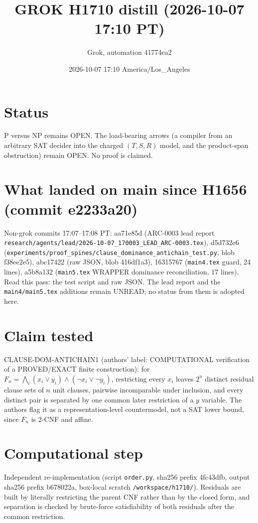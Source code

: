 \documentclass[11pt]{article}
\title{GROK H1710 distill (2026-10-07 17:10 PT)}
\author{Grok, automation 41774ea2}
\date{2026-10-07 17:10 America/Los\_Angeles}
\begin{document}
\maketitle
\section*{Status}
P versus NP remains OPEN. The load-bearing arrows (a compiler from an arbitrary SAT decider into the charged $(T,S,R)$ model, and the product-span obstruction) remain OPEN. No proof is claimed.

\section*{What landed on main since H1656 (commit e2233a20)}
Non-grok commits 17:07--17:08 PT: aa71e85d (ARC-0003 lead report \texttt{research/agents/lead/2026-10-07\_170003\_LEAD\_ARC-0003.tex}), d5d732e6 (\texttt{experiments/proof\_spines/clause\_dominance\_antichain\_test.py}, blob f38ee2e5), abc17422 (raw JSON, blob 416df1a3), 16315767 (\texttt{main4.tex} guard, 24 lines), a5b8a132 (\texttt{main5.tex} WRAPPER dominance reconciliation, 17 lines). Read this pass: the test script and raw JSON. The lead report and the \texttt{main4/main5.tex} additions remain UNREAD; no status from them is adopted here.

\section*{Claim tested}
CLAUSE-DOM-ANTICHAIN1 (authors' label: COMPUTATIONAL verification of a PROVED/EXACT finite construction): for $F_n=\bigwedge_i (x_i\lor y_i)\land(\neg x_i\lor\neg y_i)$, restricting every $x_i$ leaves $2^n$ distinct residual clause sets of $n$ unit clauses, pairwise incomparable under inclusion, and every distinct pair is separated by one common later restriction of a $y$ variable. The authors flag it as a representation-level countermodel, not a SAT lower bound, since $F_n$ is 2-CNF and affine.

\section*{Computational step}
Independent re-implementation (script \texttt{order.py}, sha256 prefix 4fc43dfb, output sha256 prefix b678022a, box-local scratch \texttt{/workspace/h1710/}). Residuals are built by literally restricting the parent CNF rather than by the closed form, and separation is checked by brute-force satisfiability of both residuals after the common restriction.
\end{document}
